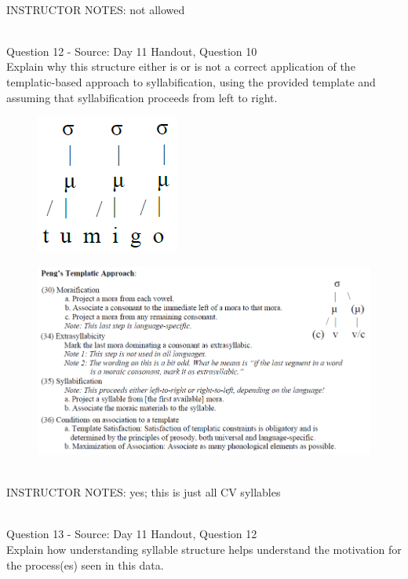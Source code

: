 \documentclass[12pt]{article}
\begin{document}
~\\
INSTRUCTOR NOTES: not allowed


~\\

{\large Question 12} - Source: Day 11 Handout, Question 10\\

Explain why this structure either is or is not a correct application of the templatic-based approach to syllabification, using the provided template and assuming that syllabification proceeds from left to right.\\

\begin{figure}[H]
\includegraphics{../images/pengtemplate_tumigo_yes.png}
\end{figure}
\begin{figure}[H]
\includegraphics{../images/peng_template_withdiagram.png}
\end{figure}

~\\
INSTRUCTOR NOTES: yes; this is just all CV syllables


~\\

{\large Question 13} - Source: Day 11 Handout, Question 12\\

Explain how understanding syllable structure helps understand the motivation for the process(es) seen in this data.\\
\end{document}
